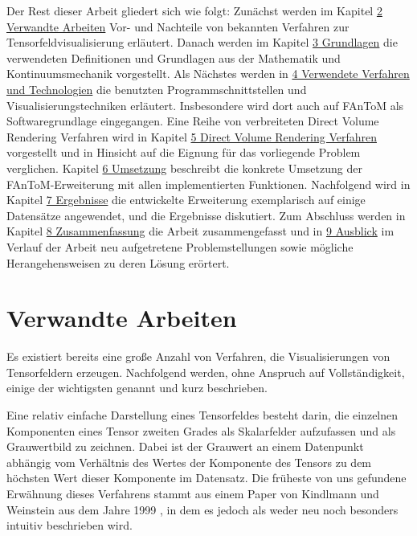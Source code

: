 \documentclass[a4paper,fontsize=12pt,toc=bib,parskip=half,ngerman]{scrartcl}
\begin{document}
Der Rest dieser Arbeit gliedert sich wie folgt: Zun\"achst werden im Kapitel \hyperref[sec:Verwandte]{2 Verwandte Arbeiten} Vor- und Nachteile von bekannten Verfahren zur Tensorfeldvisualisierung erl\"autert. Danach werden im Kapitel \hyperref[sec:Grundlagen]{3 Grundlagen} die verwendeten Definitionen und Grundlagen aus der Mathematik und Kontinuumsmechanik vorgestellt. Als N\"achstes werden in \hyperref[sec:Technologien]{4 Verwendete Verfahren und Technologien} die benutzten Programmschnittstellen und Visualisierungstechniken erl\"autert. Insbesondere wird dort auch auf FAnToM als Softwaregrundlage eingegangen. Eine Reihe von verbreiteten Direct Volume Rendering Verfahren wird in Kapitel \hyperref[sec:DVR]{5 Direct Volume Rendering Verfahren} vorgestellt und in Hinsicht auf die Eignung f\"ur das vorliegende Problem verglichen. Kapitel \hyperref[sec:Umsetzung]{6 Umsetzung} beschreibt die konkrete Umsetzung der FAnToM-Erweiterung mit allen implementierten Funktionen. Nachfolgend wird in Kapitel \hyperref[sec:Ergebnisse]{7 Ergebnisse} die entwickelte Erweiterung exemplarisch auf einige Datens\"atze angewendet, und die Ergebnisse diskutiert. Zum Abschluss werden in Kapitel \hyperref[sec:Zusammenfassung]{8 Zusammenfassung} die Arbeit zusammengefasst und in  \hyperref[sec:Ausblick]{9 Ausblick} im Verlauf der Arbeit neu aufgetretene Problemstellungen sowie m\"ogliche Herangehensweisen zu deren L\"osung er\"ortert.
 
\section{Verwandte Arbeiten}
\label{sec:Verwandte}
Es existiert bereits eine gro{\ss}e Anzahl von Verfahren, die Visualisierungen von Tensorfeldern erzeugen. Nachfolgend werden, ohne Anspruch auf Vollst\"andigkeit, einige der wichtigsten genannt und kurz beschrieben.

Eine relativ einfache Darstellung eines Tensorfeldes besteht darin, die einzelnen Komponenten eines Tensor zweiten Grades als Skalarfelder aufzufassen und als Grauwertbild zu zeichnen. Dabei ist der Grauwert an einem Datenpunkt abh\"angig vom Verh\"altnis des Wertes der Komponente des Tensors zu dem h\"ochsten Wert dieser Komponente im Datensatz. Die fr\"uheste von uns gefundene Erw\"ahnung dieses Verfahrens stammt aus einem Paper von Kindlmann und Weinstein aus dem Jahre 1999 \cite{kindlmann1999hue}, in dem es jedoch als weder neu noch besonders intuitiv beschrieben wird. 
\end{document}
